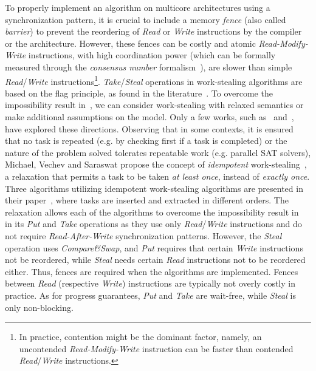To properly implement an algorithm on multicore architectures using a synchronization pattern, it is crucial to include a memory \emph{fence} (also called \emph{barrier}) to prevent the reordering of \emph{Read} or \emph{Write} instructions by the compiler or the architecture. However, these fences can be costly and atomic \emph{Read-Modify-Write} instructions, with high coordination power (which can be formally measured through the \emph{consensus number} formalism~\cite{DBLP_journals_toplas_Herlihy91}), are slower than simple \emph{Read}/\emph{Write} instructions\footnote{In practice, contention might be the dominant factor, namely, an uncontended \emph{Read-Modify-Write} instruction can be faster than contended \emph{Read}/\emph{Write} instructions.}. \emph{Take}/\emph{Steal} operations in work-stealing algorithms are based on the flag principle, as found in the literature~\cite{circular.work.stealing, DBLP_conf_pldi_FrigoLR98, non.blocking.work.stealing, 10.1145.571825.571876}. To overcome the impossibility result in~\cite{DBLP_conf_popl_AttiyaGHKMV11}, we can consider work-stealing with relaxed semantics or make additional assumptions on the model. Only a few works, such as~\cite{maged.vechev.2009} and~\cite{fencefreework}, have explored these directions. Observing that in some contexts, it is ensured that no task is repeated (e.g. by checking first if a task is completed) or the nature of the problem solved tolerates repeatable work (e.g. parallel SAT solvers), Michael, Vechev and Saraswat propose the concept of \emph{idempotent} work-stealing~\cite{maged.vechev.2009}, a relaxation that permits a task to be taken \emph{at least once}, instead of \emph{exactly once}. Three algorithms utilizing idempotent work-stealing algorithms are presented in their paper~\cite{maged.vechev.2009},  where tasks are inserted and extracted in different orders. The relaxation allows each of the algorithms to overcome the impossibility result in~\cite{DBLP_conf_popl_AttiyaGHKMV11} in its \emph{Put} and \emph{Take} operations as they use only \emph{Read}/\emph{Write} instructions and do not require \emph{Read-After-Write} synchronization patterns. However, the \emph{Steal} operation uses \emph{Compare\&Swap}, and \emph{Put} requires that certain \emph{Write} instructions not be reordered, while \emph{Steal} needs certain \emph{Read} instructions not to be reordered either. Thus, fences are required when the algorithms are implemented. Fences between \emph{Read} (respective \emph{Write}) instructions are typically not overly costly in practice. As for progress guarantees, \emph{Put} and \emph{Take} are wait-free, while \emph{Steal} is only non-blocking.

